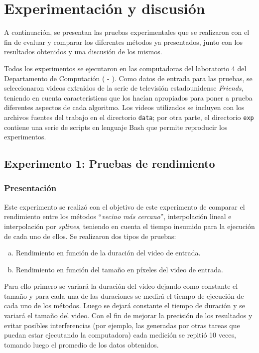 \section{Experimentación y discusión}

    A continuación, se presentan las pruebas experimentales que se realizaron con el fin de evaluar y comparar los diferentes métodos ya presentados, junto con los resultados obtenidos y una discusión de los mismos.

    Todos los experimentos se ejecutaron en las computadoras del laboratorio 4 del Departamento de Computación ( - ). Como datos de entrada para las pruebas, se seleccionaron videos extraidos de la serie de televisión estadounidense \emph{Friends}, teniendo en cuenta características que los hacían apropiados para poner a prueba diferentes aspectos de cada algoritmo. Los videos utilizados se incluyen con los archivos fuentes del trabajo en el directorio \texttt{data}; por otra parte, el directorio \texttt{exp} contiene una serie de scripts en lenguaje Bash que permite reproducir los experimentos.

    \subsection{Experimento 1: Pruebas de rendimiento}

        \subsubsection*{Presentación}

            Este experimento se realizó con el objetivo de este experimento de comparar el rendimiento entre los métodos ``\emph{vecino más cercano}'', interpolación lineal e interpolación por \emph{splines}, teniendo en cuenta el tiempo insumido para la ejecución de cada uno de ellos. Se realizaron dos tipos de pruebas:

            \begin{enumerate}[(a)]
                \item Rendimiento en función de la duración del video de entrada.
                \item Rendimiento en función del tamaño en píxeles del video de entrada.
            \end{enumerate}

            Para ello primero se variará la duración del video dejando como constante el tamaño y para cada una de las duraciones se medirá el tiempo de ejecución de cada uno de los métodos. Luego se dejará constante el tiempo de duración y se variará el tamaño del video. Con el fin de mejorar la precisión de los resultados y evitar posibles interferencias (por ejemplo, las generadas por otras tareas que puedan estar ejecutando la computadora) cada medición se repitió 10 veces, tomando luego el promedio de los datos obtenidos.

